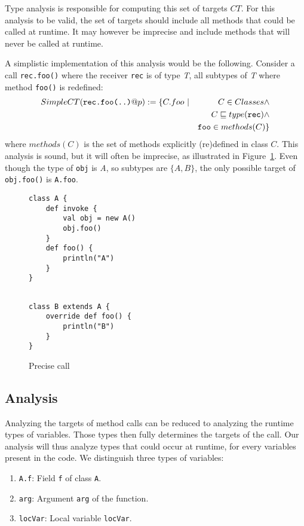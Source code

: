 Type analysis is responsible for computing this set of targets $CT$. For this
analysis to be valid, the set of targets should include all methods that could
be called at runtime. It may however be imprecise and include methods that will
never be called at runtime.

A simplistic implementation of this analysis would be the following. Consider a
call \lstinline{rec.foo()} where the receiver \lstinline{rec} is of type
\emph{T}, all subtypes of \emph{T} where method \lstinline{foo()} is redefined:
\begin{eqnarray*}
        SimpleCT(\verb/rec.foo(..)/@p) := \{C.foo ~ &|& C \in Classes \land \\
        && C \subtypeeq type(\verb/rec/) \land \\
        && \verb/foo/ \in methods(C) \}
\end{eqnarray*}
where $methods(C)$ is the set of methods explicitly (re)defined in class $C$.
This analysis is sound,
but it will often be imprecise, as illustrated in
Figure~\ref{fig:ta:example2}. Even though the type of \lstinline{obj} is
\emph{A}, so subtypes are $\{A, B\}$, the only possible target of
\lstinline{obj.foo()} is \lstinline{A.foo}.

\begin{figure}[h]
    \centering

\begin{minipage}[tl]{0.6\linewidth}
    \centering
\lstset{linewidth=0.6\linewidth}
\begin{lstlisting}
class A {
    def invoke {
        val obj = new A()
        obj.foo()
    }
    def foo() {
        println("A")
    }
}
\end{lstlisting}
\end{minipage}
\begin{minipage}[tl]{0.6\linewidth}
    \centering
\lstset{linewidth=0.6\linewidth}
\begin{lstlisting}

class B extends A {
    override def foo() {
        println("B")
    }
}
\end{lstlisting}
\end{minipage}
    \caption{Precise call}
    \label{fig:ta:example2}
\end{figure}

\subsection{Analysis}
Analyzing the targets of method calls can be reduced to analyzing the runtime
types of variables. Those types then fully determines the targets of the call.
Our analysis will thus analyze types that could occur at runtime, for every
variables present in the code. We distinguish three types of variables:
\begin{enumerate}
    \item \verb/A.f/: Field \verb/f/ of class \verb/A/.
    \item \verb/arg/: Argument \verb/arg/ of the function.
    \item \verb/locVar/: Local variable \verb/locVar/.
\end{enumerate}

